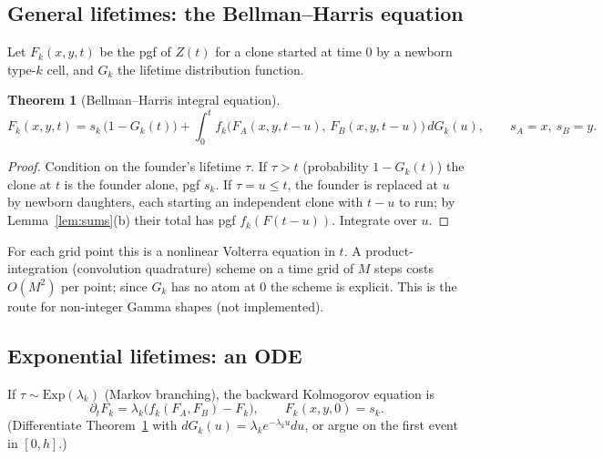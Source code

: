\documentclass[11pt]{article}
\newtheorem{theorem}{Theorem}[section]
\theoremstyle{definition}
\theoremstyle{remark}
\begin{document}
\subsection{General lifetimes: the Bellman--Harris equation}
Let $F_k(x,y,t)$ be the pgf of $Z(t)$ for a clone started at time 0 by a newborn type-$k$ cell, and $G_k$ the lifetime distribution function.
\begin{theorem}[Bellman--Harris integral equation]\label{thm:bhint}
\[
F_k(x,y,t)=s_k\,\big(1-G_k(t)\big)+\int_0^t f_k\big(F_A(x,y,t-u),\,F_B(x,y,t-u)\big)\,dG_k(u),\qquad s_A=x,\ s_B=y .
\]
\end{theorem}
\begin{proof}
Condition on the founder's lifetime $\tau$. If $\tau>t$ (probability $1-G_k(t)$) the clone at $t$ is the founder alone, pgf $s_k$. If $\tau=u\le t$, the founder is replaced at $u$ by newborn daughters, each starting an independent clone with $t-u$ to run; by Lemma~\ref{lem:sums}(b) their total has pgf $f_k(F(t-u))$. Integrate over $u$.
\end{proof}
For each grid point this is a nonlinear Volterra equation in $t$. A product-integration (convolution quadrature) scheme on a time grid of $M$ steps costs $O(M^2)$ per point; since $G_k$ has no atom at 0 the scheme is explicit. This is the route for non-integer Gamma shapes (not implemented).

\subsection{Exponential lifetimes: an ODE}
If $\tau\sim\mathrm{Exp}(\lambda_k)$ (Markov branching), the backward Kolmogorov equation is
\[
\partial_tF_k=\lambda_k\big(f_k(F_A,F_B)-F_k\big),\qquad F_k(x,y,0)=s_k .
\]
(Differentiate Theorem~\ref{thm:bhint} with $dG_k(u)=\lambda_ke^{-\lambda_ku}du$, or argue on the first event in $[0,h]$.)
\end{document}
